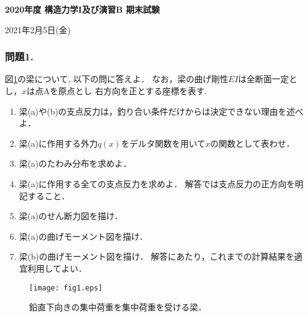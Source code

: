 \documentclass[10pt,a4j]{jarticle}
\newlength{\minitwocolumn}
\begin{document}
\newcommand{\fat}[1]{\mbox{\boldmath $#1$}}
\newcommand{\D}{\partial}
\newcommand{\w}{\omega}
\newcommand{\ga}{\alpha}
\newcommand{\gb}{\beta}
\newcommand{\gx}{\xi}
\newcommand{\gz}{\zeta}
\newcommand{\vhat}[1]{\hat{\fat{#1}}}
\newcommand{\spc}{\vspace{0.7\baselineskip}}
\newcommand{\halfspc}{\vspace{0.3\baselineskip}}

\newcommand{\twofig}[2]
 {
   \begin{figure}[h]
     \begin{minipage}[t]{\minitwocolumn}
         \begin{center}   #1
         \end{center}
     \end{minipage}
         \hspace{\columnsep}
     \begin{minipage}[t]{\minitwocolumn}
         \begin{center} #2
         \end{center}
     \end{minipage}
   \end{figure}
 }
\begin{center}
{\Large \bf 2020年度 構造力学I及び演習B 期末試験} \\
\end{center}
\begin{flushright}
	2021年2月5日(金)
\end{flushright}
%
%
%
\subsubsection*{問題1.}
図\ref{fig:fig1}の梁について, 以下の問に答えよ．
なお，梁の曲げ剛性$EI$は全断面一定とし，$x$は点Aを原点とし
右方向を正とする座標を表す. 
\begin{enumerate}
\item
	梁(a)や(b)の支点反力は，釣り合い条件だけからは決定できない理由を述べよ．
\item
	梁(a)に作用する外力$q(x)$をデルタ関数を用いて$x$の関数として表わせ．
\item
	梁(a)のたわみ分布を求めよ．
\item
	梁(a)に作用する全ての支点反力を求めよ．
	解答では支点反力の正方向を明記すること．
\item
	梁(a)のせん断力図を描け．
\item
	梁(a)の曲げモーメント図を描け．
\item
	梁(b)の曲げモーメント図を描け．
	解答にあたり，これまでの計算結果を適宜利用してよい．
\end{enumerate}
\begin{figure}[h]
	\begin{center}
	\texttt{[image: fig1.eps]} 
	\end{center}
	\caption{鉛直下向きの集中荷重を集中荷重を受ける梁．} 
	\label{fig:fig1}
\end{figure}
\newpage
\end{document}
